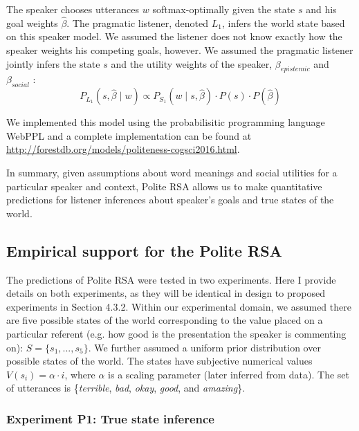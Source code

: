 The speaker chooses utterances $w$ softmax-optimally given the state $s$ and his goal weights $\hat{\beta}$. The pragmatic listener, denoted $L_1$, infers the world state based on this speaker model. We assumed the listener does not know exactly how the speaker weights his competing goals, however.
We assumed the pragmatic listener jointly infers the state $s$ and the utility weights of the speaker, $\beta_{epistemic}$ and $\beta_{social}$ \citep{GoodmanLassiter2015, Kao2014}:
\begin{equation}
P_{L_1}(s,  \hat{\beta} \mid w)\propto P_{S_1}(w \mid s,  \hat{\beta})\cdot P(s) \cdot P( \hat{\beta}) \label{eq:L1}
\end{equation}

We implemented this model using the probabilisitic programming language WebPPL \cite{dippl} and a complete implementation can be found at \url{http://forestdb.org/models/politeness-cogsci2016.html}.

In summary, given assumptions about word meanings and social utilities for a particular speaker and context, Polite RSA allows us to make quantitative predictions for listener inferences about speaker's goals and true states of the world.

\subsection{Empirical support for the Polite RSA}

The predictions of Polite RSA were tested in two experiments. Here I provide details on both experiments, as they will be identical in design to proposed experiments in Section 4.3.2. %
Within our experimental domain, we assumed there are five possible states of the world corresponding to the value placed on a particular referent (e.g. how good is the presentation the speaker is commenting on): $S = \{s_{1}, ...,  s_{5}\}$.
We further assumed a uniform prior distribution over possible states of the world.
The states have subjective numerical values $V(s_{i}) = \alpha \cdot i$, where $\alpha$ is a scaling parameter (later inferred from data).
The set of utterances is \{\emph{terrible}, \emph{bad}, \emph{okay}, \emph{good}, and \emph{amazing}\}.

\subsubsection{Experiment P1: True state inference}

